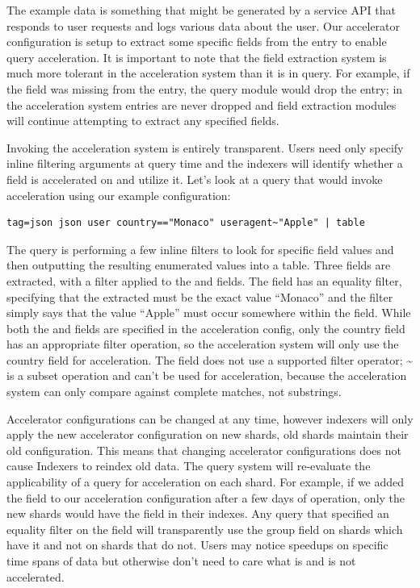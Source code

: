 {The example data is something that might be generated by a service API
that responds to user requests and logs various data about the user.
Our accelerator configuration is setup to extract some specific fields
from the entry to enable query acceleration. It is important to note
that the field extraction system is much more tolerant in the
acceleration system than it is in query. For example, if the field
 was missing from the entry, the  query module would drop
the entry; in the acceleration system entries are never dropped and
field extraction modules will continue attempting to extract any
specified fields.

Invoking the acceleration system is entirely transparent. Users need
only specify inline filtering arguments at query time and the indexers
will identify whether a field is accelerated on and utilize it. Let's
look at a query that would invoke acceleration using our example
configuration:

\begin{Verbatim}[breaklines=true]
tag=json json user country=="Monaco" useragent~"Apple" | table
\end{Verbatim}

The query is performing a few inline filters to look for specific field
values and then outputting the resulting enumerated values into a table.
Three fields are extracted, with a filter applied to the
 and  fields. The  field has an
equality filter, specifying that the extracted  must be the
exact value ``Monaco'' and the  filter simply says that the
value ``Apple'' must occur somewhere within the  field.
While both the  and  fields are specified in the
acceleration config, only the country field has an appropriate
filter operation, so the acceleration system will only use the
country field for acceleration. The  field does not
use a supported filter operator; \textasciitilde{} is a subset operation and can't
be used for acceleration, because the acceleration system can only compare
against complete matches, not substrings.

Accelerator configurations can be changed at any time, however indexers
will only apply the new accelerator configuration on new shards, old
shards maintain their old configuration. This means that changing
accelerator configurations does not cause Indexers to reindex old data.
The query system will re-evaluate the applicability of a query for
acceleration on each shard. For example, if we added the field
 to our acceleration configuration after a few days of
operation, only the new shards would have the field in their indexes.
Any query that specified an equality filter on the  field will
transparently use the group field on shards which have it and not on shards
that do not. Users may notice speedups on specific time spans of data
but otherwise don't need to care what is and is not accelerated.

}
